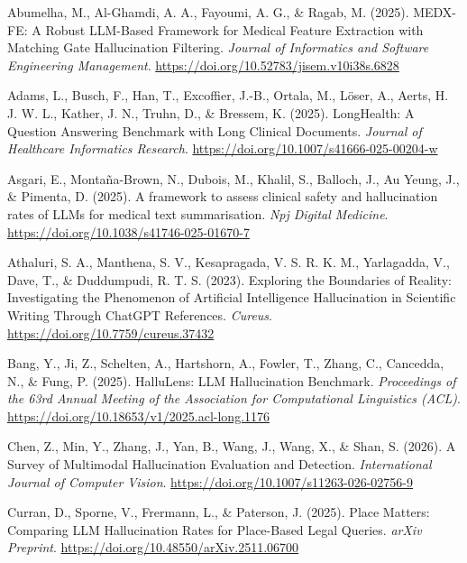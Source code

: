 \documentclass[
  11pt,
  a4paper,
]{article}
\newlength{\cslhangindent}
\newenvironment{CSLReferences}[2] %
 {\begin{list}{}{%
  \setlength{\itemindent}{0pt}
  \setlength{\leftmargin}{0pt}
  \setlength{\parsep}{0pt}
  \ifodd #1
   \setlength{\leftmargin}{\cslhangindent}
   \setlength{\itemindent}{-1\cslhangindent}
  \fi
  \setlength{\itemsep}{#2\baselineskip}}}
 {\end{list}}
\begin{document}
\label{refs}
\begin{CSLReferences}{1}{0}
Abumelha, M., Al-Ghamdi, A. A., Fayoumi, A. G., \& Ragab, M. (2025).
{MEDX-FE: A Robust LLM-Based Framework for Medical Feature Extraction
with Matching Gate Hallucination Filtering}. \emph{Journal of
Informatics and Software Engineering Management}.
\url{https://doi.org/10.52783/jisem.v10i38s.6828}

Adams, L., Busch, F., Han, T., Excoffier, J.-B., Ortala, M., Löser, A.,
Aerts, H. J. W. L., Kather, J. N., Truhn, D., \& Bressem, K. (2025).
{LongHealth: A Question Answering Benchmark with Long Clinical
Documents}. \emph{Journal of Healthcare Informatics Research}.
\url{https://doi.org/10.1007/s41666-025-00204-w}

Asgari, E., Montaña-Brown, N., Dubois, M., Khalil, S., Balloch, J., Au
Yeung, J., \& Pimenta, D. (2025). {A framework to assess clinical safety
and hallucination rates of LLMs for medical text summarisation}.
\emph{Npj Digital Medicine}.
\url{https://doi.org/10.1038/s41746-025-01670-7}

Athaluri, S. A., Manthena, S. V., Kesapragada, V. S. R. K. M.,
Yarlagadda, V., Dave, T., \& Duddumpudi, R. T. S. (2023). {Exploring the
Boundaries of Reality: Investigating the Phenomenon of Artificial
Intelligence Hallucination in Scientific Writing Through ChatGPT
References}. \emph{Cureus}. \url{https://doi.org/10.7759/cureus.37432}

Bang, Y., Ji, Z., Schelten, A., Hartshorn, A., Fowler, T., Zhang, C.,
Cancedda, N., \& Fung, P. (2025). {HalluLens: LLM Hallucination
Benchmark}. \emph{Proceedings of the 63rd Annual Meeting of the
Association for Computational Linguistics (ACL)}.
\url{https://doi.org/10.18653/v1/2025.acl-long.1176}

Chen, Z., Min, Y., Zhang, J., Yan, B., Wang, J., Wang, X., \& Shan, S.
(2026). {A Survey of Multimodal Hallucination Evaluation and Detection}.
\emph{International Journal of Computer Vision}.
\url{https://doi.org/10.1007/s11263-026-02756-9}

Curran, D., Sporne, V., Frermann, L., \& Paterson, J. (2025). {Place
Matters: Comparing LLM Hallucination Rates for Place-Based Legal
Queries}. \emph{arXiv Preprint}.
\url{https://doi.org/10.48550/arXiv.2511.06700}


\end{CSLReferences}
\end{document}
